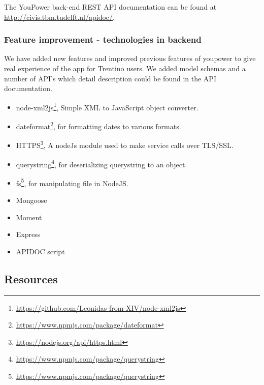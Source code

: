 The YouPower back-end REST API documentation can be found at {\footnotesize\url{http://civis.tbm.tudelft.nl/apidoc/}}. 
% 
\subsubsection{Feature improvement - technologies in backend}
We have added new features and improved previous features of youpower to give real experience of the app for Trentino users. We added model schemas and a number of API's which detail description could be found in the API documentation.
\begin{itemize}
\item node-xml2js\footnote{\url{https://github.com/Leonidas-from-XIV/node-xml2js}}, Simple XML to JavaScript object converter. 
\item dateformat\footnote{\url{https://www.npmjs.com/package/dateformat}}, for formatting dates to various formats. 
\item HTTPS\footnote{\url{https://nodejs.org/api/https.html}}, A nodeJs module used to make service calls over TLS/SSL. 
\item querystring\footnote{\url{https://www.npmjs.com/package/querystring}}, for deserializing querystring to an object. 
\item fs\footnote{\url{https://www.npmjs.com/package/querystring}}, for manipulating file in NodeJS. 
\item Mongoose
\item Moment
\item Express
\item APIDOC script
\end{itemize}


\subsection{Resources}